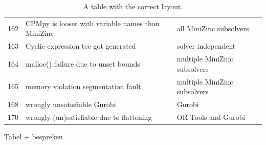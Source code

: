 \begin{table}[]
\begin{tabular}{lll}
		162   & CPMpy is looser with variable names than MiniZinc         & all MiniZinc subsolvers                        \\
		163   & Cyclic expression tee got generated                       & solver independent                             \\
		164   & malloc() failure due to unset bounds                      & multiple MiniZinc subsolvers                   \\
		165   & memory violation segmentation fault                       & multiple MiniZinc subsolvers                   \\
		168   & wrongly unsatisfiable Gurobi                              & Gurobi                                         \\
		170   & wrongly (un)satisfiable due to flattening                 & OR-Tools and Gurobi                            \\ \bottomrule
	\end{tabular}
	\caption{A table with the correct layout.}
	\label{tab:bug:Solver}
\end{table}

Tabel + bespreken

